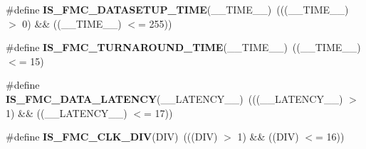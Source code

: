 \begin{DoxyCompactItemize}
\item 
\#define {\bfseries I\+S\+\_\+\+F\+M\+C\+\_\+\+D\+A\+T\+A\+S\+E\+T\+U\+P\+\_\+\+T\+I\+ME}(\+\_\+\+\_\+\+T\+I\+M\+E\+\_\+\+\_\+)~(((\+\_\+\+\_\+\+T\+I\+M\+E\+\_\+\+\_\+) $>$ 0) \&\& ((\+\_\+\+\_\+\+T\+I\+M\+E\+\_\+\+\_\+) $<$= 255))\hypertarget{group___f_s_m_c___l_l___assert___macros_ga84ceccc7ed460666c05db824b8f12f4f}{}\label{group___f_s_m_c___l_l___assert___macros_ga84ceccc7ed460666c05db824b8f12f4f}

\item 
\#define {\bfseries I\+S\+\_\+\+F\+M\+C\+\_\+\+T\+U\+R\+N\+A\+R\+O\+U\+N\+D\+\_\+\+T\+I\+ME}(\+\_\+\+\_\+\+T\+I\+M\+E\+\_\+\+\_\+)~((\+\_\+\+\_\+\+T\+I\+M\+E\+\_\+\+\_\+) $<$= 15)\hypertarget{group___f_s_m_c___l_l___assert___macros_ga552d2f02f418cd96d3a16b743b7b0098}{}\label{group___f_s_m_c___l_l___assert___macros_ga552d2f02f418cd96d3a16b743b7b0098}

\item 
\#define {\bfseries I\+S\+\_\+\+F\+M\+C\+\_\+\+D\+A\+T\+A\+\_\+\+L\+A\+T\+E\+N\+CY}(\+\_\+\+\_\+\+L\+A\+T\+E\+N\+C\+Y\+\_\+\+\_\+)~(((\+\_\+\+\_\+\+L\+A\+T\+E\+N\+C\+Y\+\_\+\+\_\+) $>$ 1) \&\& ((\+\_\+\+\_\+\+L\+A\+T\+E\+N\+C\+Y\+\_\+\+\_\+) $<$= 17))\hypertarget{group___f_s_m_c___l_l___assert___macros_gaff7bf46d90db1e9fc9960e25728d7524}{}\label{group___f_s_m_c___l_l___assert___macros_gaff7bf46d90db1e9fc9960e25728d7524}

\item 
\#define {\bfseries I\+S\+\_\+\+F\+M\+C\+\_\+\+C\+L\+K\+\_\+\+D\+IV}(D\+IV)~(((D\+IV) $>$ 1) \&\& ((D\+IV) $<$= 16))\hypertarget{group___f_s_m_c___l_l___assert___macros_gad61a20de71250a74f5e73ba9293e55ab}{}\label{group___f_s_m_c___l_l___assert___macros_gad61a20de71250a74f5e73ba9293e55ab}


\end{DoxyCompactItemize}
